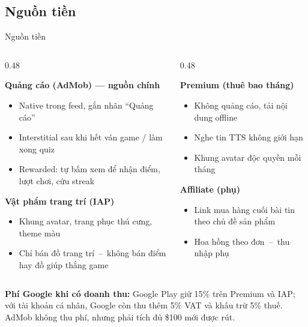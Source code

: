 \subsection{Nguồn tiền}
\begin{frame}{Nguồn tiền}
\footnotesize
\begin{columns}[T]
\begin{column}{0.48\textwidth}
\begin{block}{\scriptsize\bfseries Quảng cáo (AdMob) --- nguồn chính}
{\tiny
\begin{itemize}\setlength{\itemsep}{2pt}
\item Native trong feed, gắn nhãn ``Quảng cáo''
\item Interstitial sau khi hết ván game / làm xong quiz
\item Rewarded: tự bấm xem để nhận điểm, lượt chơi, cứu streak
\end{itemize}}
\end{block}
\begin{block}{\scriptsize\bfseries Vật phẩm trang trí (IAP)}
{\tiny
\begin{itemize}\setlength{\itemsep}{2pt}
\item Khung avatar, trang phục thú cưng, theme màu
\item Chỉ bán đồ trang trí~--~không bán điểm hay đồ giúp thắng game
\end{itemize}}
\end{block}
\end{column}
\begin{column}{0.48\textwidth}
\begin{block}{\scriptsize\bfseries Premium (thuê bao tháng)}
{\tiny
\begin{itemize}\setlength{\itemsep}{2pt}
\item Không quảng cáo, tải nội dung offline
\item Nghe tin TTS không giới hạn
\item Khung avatar độc quyền mỗi tháng
\end{itemize}}
\end{block}
\begin{block}{\scriptsize\bfseries Affiliate (phụ)}
{\tiny
\begin{itemize}\setlength{\itemsep}{2pt}
\item Link mua hàng cuối bài tin theo chủ đề sản phẩm
\item Hoa hồng theo đơn~--~thu nhập phụ
\end{itemize}}
\end{block}
\end{column}
\end{columns}
\vspace{1.5mm}
{\tiny\color{TextGray}\textbf{Phí Google khi có doanh thu:} Google Play giữ 15\% trên Premium và IAP; với tài khoản cá nhân, Google còn thu thêm 5\% VAT và khấu trừ 5\% thuế. AdMob không thu phí, nhưng phải tích đủ \$100 mới được rút.}
\end{frame}

